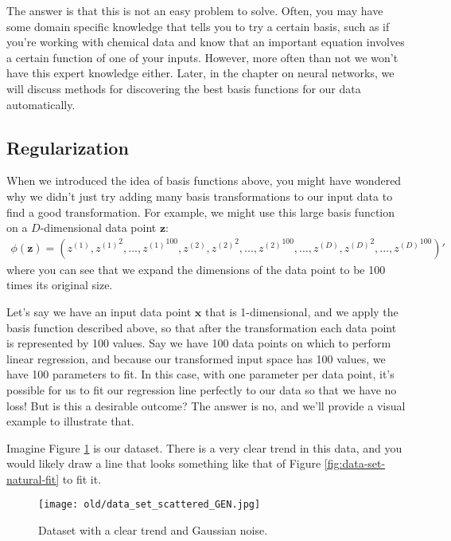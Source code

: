 The answer is that this is not an easy problem to solve. Often, you may have some domain specific knowledge that tells you to try a certain basis, such as if you're working with chemical data and know that an important equation involves a certain function of one of your inputs. However, more often than not we won't have this expert knowledge either. Later, in the chapter on neural networks, we will discuss methods for discovering the best basis functions for our data automatically.

\subsection{Regularization}
When we introduced the idea of basis functions above, you might have wondered why we didn't just try adding many basis transformations to our input data to find a good transformation. For example, we might use this large basis function on a $D$-dimensional data point $\mathbf{z}$:
\begin{align*}
    \phi(\mathbf{z}) = (z^{(1)}, {z^{(1)}}^{2}, ..., {z^{(1)}}^{100}, z^{(2)}, {z^{(2)}}^{2}, ..., {z^{(2)}}^{100}, ..., z^{(D)}, {z^{(D)}}^{2}, ..., {z^{(D)}}^{100})'
\end{align*}
where you can see that we expand the dimensions of the data point to be 100 times its original size.

Let's say we have an input data point $\mathbf{x}$ that is 1-dimensional, and we apply the basis function described above, so that after the transformation each data point is represented by 100 values. Say we have 100 data points on which to perform linear regression, and because our transformed input space has 100 values, we have 100 parameters to fit. In this case, with one parameter per data point, it's possible for us to fit our regression line perfectly to our data so that we have no loss! But is this a desirable outcome? The answer is no, and we'll provide a visual example to illustrate that.

Imagine Figure \ref{fig:data-set-scattered} is our dataset. There is a very clear trend in this data, and you would likely draw a line that looks something like that of Figure \ref{fig:data-set-natural-fit} to fit it.

\begin{figure}
    \centering
    \texttt{[image: old/data\_set\_scattered\_GEN.jpg]}
    \caption{Dataset with a clear trend and Gaussian noise.}
    \label{fig:data-set-scattered}
\end{figure}

